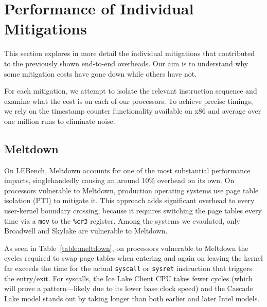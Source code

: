 \section{Performance of Individual Mitigations}
\label{s:eval}

This section explores in more detail the individual mitigations that contributed
to the previously shown end-to-end overheads.
Our aim is to understand why some mitigation costs have gone down while others have not.

For each mitigation, we attempt to isolate the relevant instruction sequence and examine what the cost is on each of our processors.
To achieve precise timings, we rely on the timestamp counter functionality available on x86 and average over one million runs to eliminate noise.

\subsection{Meltdown}

On LEBench, Meltdown accounts for one of the most substantial performance impacts, singlehandedly causing an around 10\% overhead on its own.
On processors vulnerable to Meltdown, production operating systems use page table isolation (PTI) to mitigate it.
This approach adds significant overhead to every user-kernel boundary crossing, because it requires switching the page tables every time via a \texttt{mov} to the \texttt{\%cr3} register.
Among the systems we evaulated, only Broadwell and Skylake are vulnerable to Meltdown.

As seen in Table~\ref{table:meltdown}, on processors vulnerable to Meltdown the cycles required to swap page tables when entering and again on leaving the kernel far exceeds the time for the actual \texttt{syscall} or \texttt{sysret} instruction that triggers the entry/exit.
For syscalls, the Ice Lake Client CPU takes fewer cycles (which will prove a pattern---likely due to its lower base clock speed) and the Cascade Lake model stands out by taking longer than both earlier and later Intel models.


